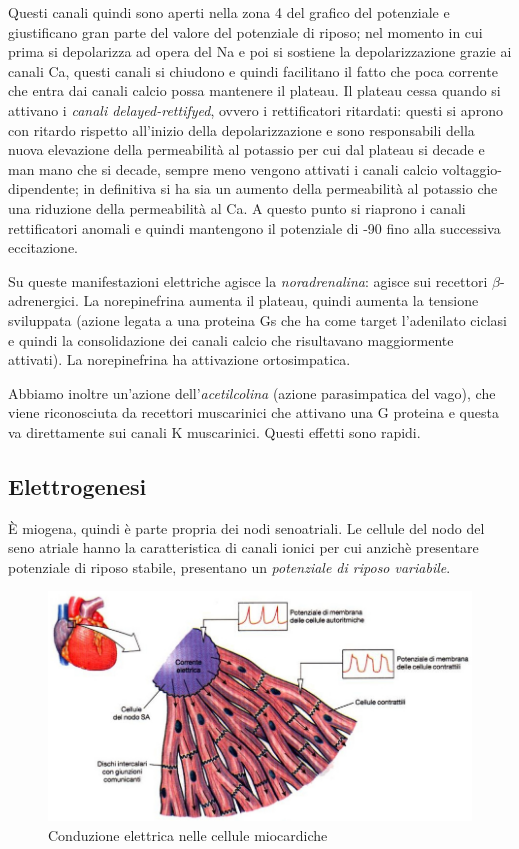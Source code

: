 \documentclass[a4paper,12pt]{article}
\begin{document}
Questi canali quindi sono aperti nella zona 4 del grafico del potenziale e giustificano gran parte del valore del potenziale di riposo; nel momento in cui prima si depolarizza ad opera del Na e poi si sostiene la depolarizzazione grazie ai canali Ca, questi canali si chiudono e quindi facilitano il fatto che poca corrente che entra dai canali calcio possa mantenere il plateau. Il plateau cessa quando si attivano i \emph{canali delayed-rettifyed}, ovvero i rettificatori ritardati: questi si aprono con ritardo rispetto all'inizio della depolarizzazione e sono responsabili della nuova elevazione della permeabilità al potassio per cui dal plateau si decade e man mano che si decade, sempre meno vengono attivati i canali calcio voltaggio-dipendente; in definitiva si ha sia un aumento della permeabilità al potassio che una riduzione della permeabilità al Ca. A questo punto si riaprono i canali rettificatori anomali e quindi mantengono il potenziale di -90 fino alla successiva eccitazione.

Su queste manifestazioni elettriche agisce la \emph{noradrenalina}: agisce sui recettori $\beta$-adrenergici. La norepinefrina aumenta il plateau, quindi aumenta la tensione sviluppata (azione legata a una proteina Gs che ha come target l'adenilato ciclasi e quindi la consolidazione dei canali calcio che risultavano maggiormente attivati). La norepinefrina ha attivazione ortosimpatica.

Abbiamo inoltre un'azione dell'\emph{acetilcolina} (azione parasimpatica del vago), che viene riconosciuta da recettori muscarinici che attivano una G proteina e questa va direttamente sui canali K muscarinici. Questi effetti sono rapidi.

\subsection{Elettrogenesi}
È miogena, quindi è parte propria dei nodi senoatriali. Le cellule del nodo del seno atriale hanno la caratteristica di canali ionici per cui anzichè presentare potenziale di riposo stabile, presentano un \emph{potenziale di riposo variabile}.
\begin{figure}[H]
\centering
\includegraphics[scale=0.4]{immagine/miogenesi.jpg}
\caption{Conduzione elettrica nelle cellule miocardiche}
\end{figure}
\end{document}
